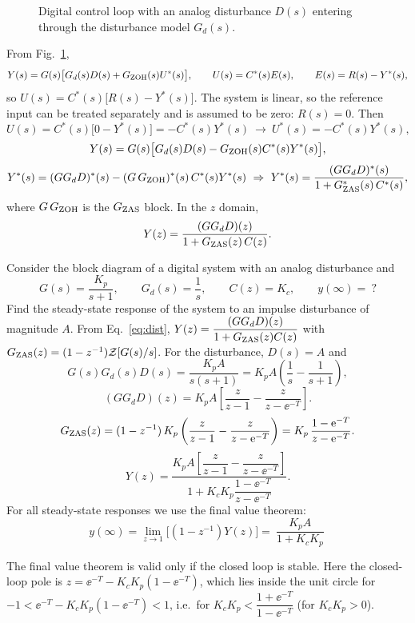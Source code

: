 \begin{figure}[ht]
\centering
\resizebox{\linewidth}{!}{\figDisturbance}
\caption{Digital control loop with an analog disturbance $D(s)$ entering through the disturbance model
$G_d(s)$.}\label{fig:disturbance}
\end{figure}

From Fig.~\ref{fig:disturbance},
\[
  Y(s)=G(s)\bigl[G_d(s)D(s)+G_{\mathrm{ZOH}}(s)U^{*}(s)\bigr],\qquad U(s)=C^{*}(s)E(s),\qquad E(s)=R(s)-Y^{*}(s),
\]
so $U(s)=C^{*}(s)\bigl[R(s)-Y^{*}(s)\bigr]$. The system is linear, so the reference input can be treated
separately and is assumed to be zero: $R(s)=0$. Then
\[
  U(s)=C^{*}(s)\bigl[0-Y^{*}(s)\bigr]=-C^{*}(s)Y^{*}(s)\ \longrightarrow\ U^{*}(s)=-C^{*}(s)Y^{*}(s),
\]
\[
  Y(s)=G(s)\bigl[G_d(s)D(s)-G_{\mathrm{ZOH}}(s)C^{*}(s)Y^{*}(s)\bigr],
\]
\[
  Y^{*}(s)=(GG_dD)^{*}(s)-(G\,\GZOH)^{*}(s)\,C^{*}(s)Y^{*}(s)
  \ \Rightarrow\ Y^{*}(s)=\frac{(GG_dD)^{*}(s)}{1+\GZAS^{*}(s)\,C^{*}(s)},
\]
where $G\,G_{\mathrm{ZOH}}$ is the $G_{\mathrm{ZAS}}$ block. In the $z$ domain,
\begin{equation}\label{eq:dist}
  Y(z)=\frac{(GG_dD)(z)}{1+G_{\mathrm{ZAS}}(z)\,C(z)}.
\end{equation}

\begin{example}
Consider the block diagram of a digital system with an analog disturbance and
\[
  G(s)=\frac{K_p}{s+1},\qquad G_d(s)=\frac1s,\qquad C(z)=K_c,\qquad y(\infty)=\ ?
\]
Find the steady-state response of the system to an impulse disturbance of magnitude $A$. From
Eq.~\eqref{eq:dist}, $Y(z)=\dfrac{(GG_dD)(z)}{1+G_{\mathrm{ZAS}}(z)C(z)}$ with $G_{\mathrm{ZAS}}(z)=(1-z^{-1})\mathcal{Z}\!\left[G(s)/s\right]$.
For the disturbance, $D(s)=A$ and
\[
  G(s)G_d(s)D(s)=\frac{K_pA}{s(s+1)}=K_pA\left(\frac1s-\frac{1}{s+1}\right),
\]
\[
  (GG_dD)(z)=K_pA\left[\frac{z}{z-1}-\frac{z}{z-\ee^{-T}}\right].
\]
\[
  G_{\mathrm{ZAS}}(z)=(1-z^{-1})\,K_p\left(\frac{z}{z-1}-\frac{z}{z-\mathrm{e}^{-T}}\right)=K_p\,\frac{1-\mathrm{e}^{-T}}{z-\mathrm{e}^{-T}}.
\]
\[
  Y(z)=\frac{K_pA\left[\dfrac{z}{z-1}-\dfrac{z}{z-\ee^{-T}}\right]}{1+K_cK_p\dfrac{1-\ee^{-T}}{z-\ee^{-T}}}.
\]
For all steady-state responses we use the final value theorem:
\[
  y(\infty)=\lim_{z\to1}\bigl[(1-z^{-1})Y(z)\bigr]=\boxed{\ \frac{K_pA}{1+K_cK_p}\ }
\]
\end{example}

\begin{remark}[added]
The final value theorem is valid only if the closed loop is stable. Here the closed-loop pole is
$z=\ee^{-T}-K_cK_p(1-\ee^{-T})$, which lies inside the unit circle for
$-1<\ee^{-T}-K_cK_p(1-\ee^{-T})<1$, i.e.\ for $K_cK_p<\dfrac{1+\ee^{-T}}{1-\ee^{-T}}$ (for $K_cK_p>0$).
\end{remark}

